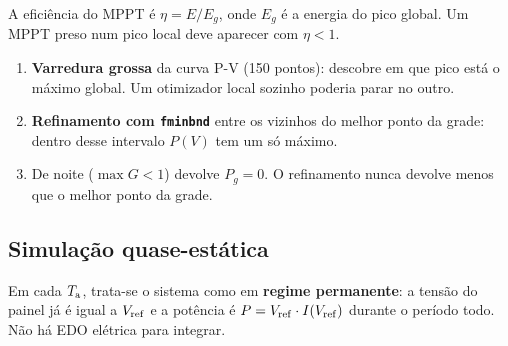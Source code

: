 A efici\^encia do MPPT \'e $\eta=E/E_g$, onde $E_g$ \'e a energia do pico global. Um MPPT preso num pico local deve aparecer com $\eta<1$.


\begin{logica}
\begin{enumerate}
\item \textbf{Varredura grossa} da curva P-V (150 pontos): descobre em que pico est\'a o m\'aximo global. Um otimizador local sozinho poderia parar no outro.
\item \textbf{Refinamento com \texttt{fminbnd}} entre os vizinhos do melhor ponto da grade: dentro desse intervalo $P(V)$ tem um s\'o m\'aximo.
\item De noite ($\max G<1$) devolve $P_g=0$. O refinamento nunca devolve menos que o melhor ponto da grade.
\end{enumerate}
\end{logica}


\subsection{Simula\c{c}\~ao quase-est\'atica}

Em cada $T_{\mathrm{a}}$, trata-se o sistema como em \textbf{regime permanente}: a tens\~ao do painel j\'a \'e igual a $V_{\mathrm{ref}}$ e a pot\^encia \'e $P=V_{\mathrm{ref}}\cdot I(V_{\mathrm{ref}})$ durante o per\'iodo todo. N\~ao h\'a EDO
el\'etrica para integrar.


